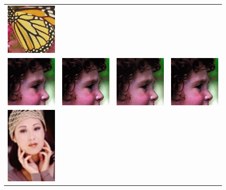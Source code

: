 \documentclass[10pt,twocolumn,letterpaper]{article}
\begin{document}
\begin{figure}[h!]
\begin{tabular}{cccc}
\includegraphics[width=1.4in]{images/used/appendix/jpg/Set5/butterfly_HR} \\
\includegraphics[width=1.4in]{images/used/appendix/jpg/Set5/head_bicubic}&
\includegraphics[width=1.4in]{images/used/appendix/jpg/Set5/head_SRResNet-MSE} &
\includegraphics[width=1.4in]{images/used/appendix/jpg/Set5/head_SRGAN-VGG54} &
\includegraphics[width=1.4in]{images/used/appendix/jpg/Set5/head_HR} \\
\includegraphics[width=1.4in]{images/used/appendix/jpg/Set5/woman_bicubic}&

\end{tabular}
\end{figure}
\end{document}

